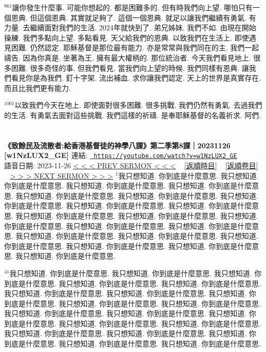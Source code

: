 \documentclass{book}
\begin{document}
$^{961}$讓你發生什麼事.
可能你想起的.
都是困難多的.
但有時我們向上望.
哪怕只有一個恩典.
但這個恩典.
其實就足夠了.
這個一個恩典.
就足以讓我們繼續有勇氣.
有力量.
去繼續面對我們的生活.
2024年就快到了.
弟兄姊妹.
我們不如.
由現在開始操練.
我們多點向上望.
多點看見.
天父給我們的恩典.
以致我們在生活上.
即使遇見困難.
仍然認定.
耶穌基督是那位最有能力.
亦是常常與我們同在的主.
我們一起禱告.
因為你真是.
坐著為王.
擁有最大權柄的.
那位統治者.
今天我們看見地上.
很多困難.
很多奇怪的事.
但我們看見.
當我們向上望的時候.
我們同樣有恩典.
讓我們看見你是為我們.
釘十字架.
流出補血.
求你讓我們認定.
天上的世界是真實存在.
而且比我們更有能力.

$^{1001}$以致我們今天在地上.
即使面對很多困難.
很多挑戰.
我們仍然有勇氣.
去過我們的生活.
有勇氣去面對這些挑戰.
我們這樣的祈禱.
是奉耶穌基督的名義祈求.
阿們.
\newpage



\section{}
\label{sec:w1NzLUX2_GE}
\textbf{《致餘民及流散者:給香港基督徒的神學八課》第二季第8課｜20231126 [w1NzLUX2\_GE]}
\newline
\newline
連結: \href{https://youtube.com/watch?v=w1NzLUX2_GE}{\texttt{ https://youtube.com/watch?v=w1NzLUX2\_GE}} ~~~~ 語音日期: 2023-11-26 
\newline
\newline
\hyperref[sec:2LIl7VilU18]{\small{< < < PREV SERMON < < <}}
~
\hyperref[sec:index_chronic]{\small{[返順時目]}}
~
\hyperref[sec:index_scriptual]{\small{[返順卷目]}}
~
\hyperref[sec:lfg8MyM5M04]{\small{> > > NEXT SERMON > > >}}
\newline
\newline
$^{1}$我只想知道.
你到底是什麼意思.
我只想知道.
你到底是什麼意思.
我只想知道.
你到底是什麼意思.
我只想知道.
你到底是什麼意思.
我只想知道.
你到底是什麼意思.
我只想知道.
你到底是什麼意思.
我只想知道.
你到底是什麼意思.
我只想知道.
你到底是什麼意思.
我只想知道.
你到底是什麼意思.
我只想知道.
你到底是什麼意思.
我只想知道.
你到底是什麼意思.
我只想知道.
你到底是什麼意思.
我只想知道.
你到底是什麼意思.
我只想知道.
你到底是什麼意思.
我只想知道.
你到底是什麼意思.
我只想知道.
你到底是什麼意思.
我只想知道.
你到底是什麼意思.
我只想知道.
你到底是什麼意思.
我只想知道.
你到底是什麼意思.
我只想知道.
你到底是什麼意思.

$^{41}$我只想知道.
你到底是什麼意思.
我只想知道.
你到底是什麼意思.
我只想知道.
你到底是什麼意思.
我只想知道.
你到底是什麼意思.
我只想知道.
你到底是什麼意思.
我只想知道.
你到底是什麼意思.
我只想知道.
你到底是什麼意思.
我只想知道.
你到底是什麼意思.
我只想知道.
你到底是什麼意思.
我只想知道.
你到底是什麼意思.
我只想知道.
你到底是什麼意思.
我只想知道.
你到底是什麼意思.
我只想知道.
你到底是什麼意思.
我只想知道.
你到底是什麼意思.
我只想知道.
你到底是什麼意思.
我只想知道.
你到底是什麼意思.
我只想知道.
你到底是什麼意思.
我只想知道.
你到底是什麼意思.
我只想知道.
你到底是什麼意思.
我只想知道.
你到底是什麼意思.
\end{document}
